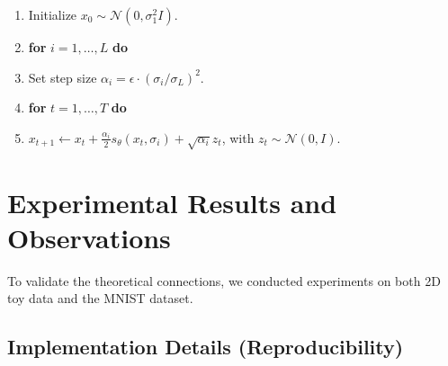 \documentclass[11pt,a4paper]{article}
\begin{document}
\begin{tcolorbox}[colback=gray!5!white,colframe=black, title={Algorithm: Annealed Langevin Dynamics}]
\begin{enumerate}[leftmargin=*,noitemsep]
  \item Initialize $x_0 \sim \mathcal{N}(0, \sigma_1^2 I)$.
  \item \textbf{for} $i = 1, \dots, L$ \textbf{do}
  \item \quad Set step size $\alpha_i = \epsilon \cdot (\sigma_i / \sigma_L)^2$.
  \item \quad \textbf{for} $t = 1, \dots, T$ \textbf{do}
  \item \quad \quad $x_{t+1} \leftarrow x_t + \frac{\alpha_i}{2} s_\theta(x_t,\sigma_i) + \sqrt{\alpha_i} z_t$, with $z_t \sim \mathcal{N}(0,I)$.
  \end{enumerate}
\end{tcolorbox}

\section{Experimental Results and Observations}

To validate the theoretical connections, we conducted experiments on both 2D toy data and the MNIST dataset.

\subsection{Implementation Details (Reproducibility)}
\end{document}
